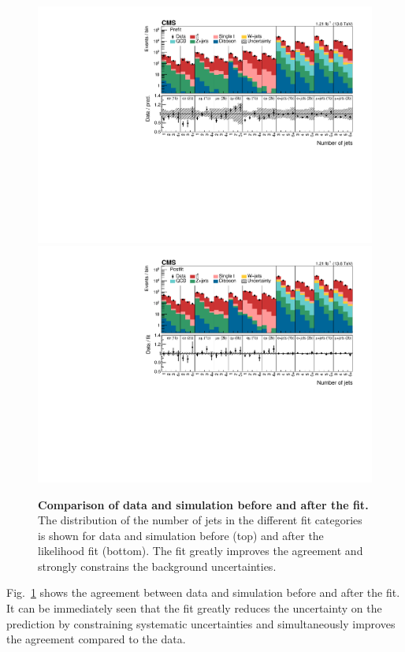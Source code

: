 \begin{figure}[!p]
\centering
\includegraphics[width=\textwidth]{figures/ttxs/prefithist.pdf}
\includegraphics[width=\textwidth]{figures/ttxs/postfithist.pdf}

\caption{
   \textbf{Comparison of data and simulation before and after the fit.} The distribution of the number of jets in the different fit categories is shown for data and simulation before (top) and after the likelihood fit (bottom). The fit greatly improves the agreement and strongly constrains the background uncertainties.
}
\label{fig:ttxs:prepostfit}
\end{figure}

Fig.~\ref{fig:ttxs:prepostfit} shows the agreement between data and simulation before and after the fit. It can be immediately seen that the fit greatly reduces the uncertainty on the prediction by constraining systematic uncertainties and simultaneously improves the agreement compared to the data. 


